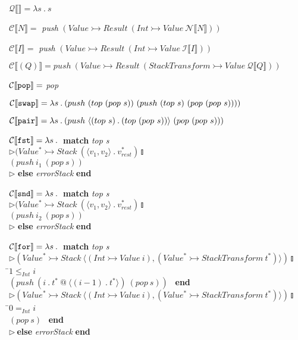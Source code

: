 \documentclass[12pt]{report}
\begin{document}
$\mathcal{Q}\llbracket \rrbracket=\lambda s\:.\:s$

$\mathcal{C}\llbracket N\rrbracket=$ {\em push} $(Value \rightarrowtail Result\ (Int \rightarrowtail Value\ \mathcal{N}\llbracket N\rrbracket))$

$\mathcal{C}\llbracket I\rrbracket=$ {\em push} $(Value \rightarrowtail Result\ (Int \rightarrowtail Value\ \mathcal{I}\llbracket I\rrbracket))$

$\mathcal{C}\llbracket (Q)\rrbracket= push\ (Value \rightarrowtail Result\ (StackTransform \rightarrowtail Value\ \mathcal{Q}\llbracket Q\rrbracket))$

$\mathcal{C}\llbracket {\tt pop}\rrbracket=$ {\em pop}

$\mathcal{C}\llbracket {\tt swap}\rrbracket=\lambda s\:.\:(push\ (top\ (pop\ s))\ (push\ (top\ s)\ (pop\ (pop\ s))))$

$\mathcal{C}\llbracket {\tt pair}\rrbracket=\lambda s\:.\:(push\ \langle (top\ s)\:.\:(top\ (pop\ s)) \rangle \ (pop\ (pop\ s)))$

\begin{tabbing}
$\mathcal{C}\llbracket {\tt fst}\rrbracket=\lambda s\:.\:$ \={\bf match} {\em top s} \\
\>$\triangleright (Value^*\rightarrowtail Stack\ (\langle v_1, v_2 \rangle \:.\: v^*_{rest}) \talloblong $\\
\>$(push\ i_1\ (pop\ s))$ \\
\>$\triangleright$ {\bf else} {\em errorStack} {\bf end}
\end{tabbing}

\begin{tabbing}
$\mathcal{C}\llbracket {\tt snd}\rrbracket=\lambda s\:.\:$ \={\bf  match} {\em top s} \\
\>$\triangleright (Value^*\rightarrowtail Stack\ (\langle v_1, v_2 \rangle \:.\: v^*_{rest}) \talloblong $\\
\>$(push\ i_2\ (pop\ s))$ \\
\>$\triangleright$ {\bf else} {\em errorStack} {\bf end}
\end{tabbing}

\begin{tabbing}
$\mathcal{C}\llbracket {\tt for}\rrbracket=\lambda s\:.\:$ \={\bf  match} {\em top s} \\
\>$\triangleright (Value^*\rightarrowtail Stack\ \langle (Int\rightarrowtail Value\ i), (Value^*\rightarrowtail StackTransform\ t^*) \rangle) \talloblong $ \\
 \=$1 \leq_{Int} i$ \\
 $(push\ (i\:.\:t^*\:@\:\langle (i-1)\:.\:t^* \rangle)\ (pop\ s)) $ \ {\bf end} \\
\>$\triangleright (Value^*\rightarrowtail Stack\ \langle (Int\rightarrowtail Value\ i), (Value^*\rightarrowtail StackTransform\ t^*) \rangle) \talloblong $ \\
 \=$0 =_{Int} i$ \\
 $ (pop\ s) $ \ {\bf end} \\
\>$\triangleright\ ${\bf else} {\em errorStack} {\bf end}
\end{tabbing}
\end{document}
